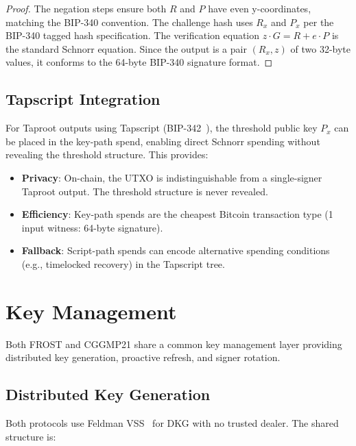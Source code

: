 \documentclass[11pt,twocolumn]{article}
\begin{document}
\begin{proof}
The negation steps ensure both $R$ and $P$ have even y-coordinates, matching the
BIP-340 convention. The challenge hash uses $R_x$ and $P_x$ per the BIP-340 tagged
hash specification. The verification equation $z \cdot G = R + e \cdot P$ is the
standard Schnorr equation. Since the output is a pair $(R_x, z)$ of two 32-byte
values, it conforms to the 64-byte BIP-340 signature format.
\end{proof}

\subsection{Tapscript Integration}

For Taproot outputs using Tapscript (BIP-342~\cite{bip342}), the threshold public key
$P_x$ can be placed in the key-path spend, enabling direct Schnorr spending without
revealing the threshold structure. This provides:

\begin{itemize}[nosep]
  \item \textbf{Privacy}: On-chain, the UTXO is indistinguishable from a single-signer
    Taproot output. The threshold structure is never revealed.
  \item \textbf{Efficiency}: Key-path spends are the cheapest Bitcoin transaction type
    (1 input witness: 64-byte signature).
  \item \textbf{Fallback}: Script-path spends can encode alternative spending conditions
    (e.g., timelocked recovery) in the Tapscript tree.
\end{itemize}

\section{Key Management}
\label{sec:keymgmt}

Both FROST and CGGMP21 share a common key management layer providing distributed key
generation, proactive refresh, and signer rotation.

\subsection{Distributed Key Generation}

Both protocols use Feldman VSS~\cite{feldman1987} for DKG with no trusted dealer.
The shared structure is:
\end{document}

